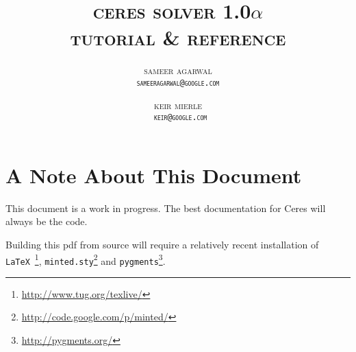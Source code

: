 \documentclass[11pt,letterpaper,oneside]{memoir}
\title{\Huge\scshape
\MakeLowercase{Ceres Solver 1.0$\alpha$}\\ 
\MakeLowercase{Tutorial \& Reference}
}
\author{
\scshape\MakeLowercase{Sameer Agarwal} \\  \texttt{sameeragarwal@google.com} 
\and 
\scshape\MakeLowercase{Keir Mierle} \\  \texttt{ keir@google.com}
}
\begin{document}

\maketitle
\thispagestyle{empty}
\newpage
\pagestyle{ceres}
\tableofcontents

\chapter{A Note About This Document}
This document is a work in progress. The best documentation for Ceres will always be the code. 

Building this pdf from source will require a relatively recent installation of \texttt{LaTeX}~\footnote{\url{http://www.tug.org/texlive/}}, \texttt{minted.sty}\footnote{\url{http://code.google.com/p/minted/}} and \texttt{pygments}\footnote{\url{http://pygments.org/}}.









\end{document}
